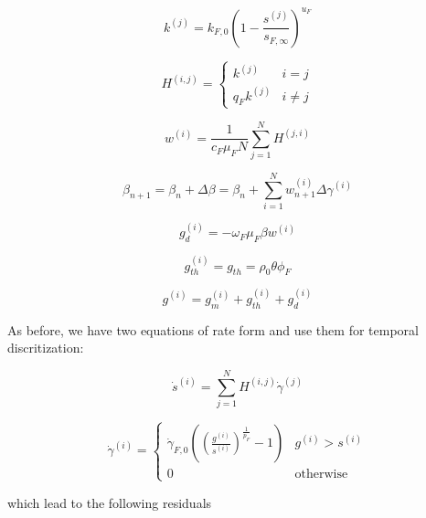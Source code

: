 \documentclass{article}
\begin{document}
\begin{equation}
    k^{(j)} = k_{F,0} \left( 1 - \frac{s^{(j)}}{s_{F,\infty}} \right)^{u_F}
\end{equation}

\begin{equation}
    H^{(i,j)} =
    \begin{cases}
        k^{(j)}       &   i = j\\
        q_F k^{(j)}   &   i \neq j
    \end{cases}
\end{equation}

\begin{equation}
    w^{(i)} = \frac{1}{c_F \mu_F N} \sum_{j=1}^N H^{(j,i)}
\end{equation}

\begin{equation}
    \beta_{n+1} = \beta_n + \Delta \beta = \beta_n + \sum_{i=1}^N w_{n+1}^{(i)} \Delta \gamma^{(i)}
\end{equation}

\begin{equation}
    g_d^{(i)} = - \omega_F \mu_F \beta w^{(i)}
\end{equation}

\begin{equation}
    g_{th}^{(i)} = g_{th} = \rho_0 \theta \phi_F
\end{equation}

\begin{equation}
    g^{(i)} = g_{m}^{(i)} + g_{th}^{(i)} + g_{d}^{(i)}
\end{equation}


As before, we have two equations of rate form and use them for temporal discritization:

\begin{equation}
    \dot{s}^{(i)} = \sum_{j=1}^N H^{(i,j)} \dot{\gamma}^{(j)}
\end{equation}

\begin{equation}
    \dot{\gamma}^{(i)} =
    \begin{cases}
        \dot{\gamma}_{F,0} \left(\left(\frac{g^{(i)}}{s^{(i)}}\right)^{\frac{1}{p_F}} - 1 \right) & g^{(i)} > s^{(i)}\\
        0 & \text{otherwise}
    \end{cases}
\end{equation}

which lead to the following residuals
\end{document}
